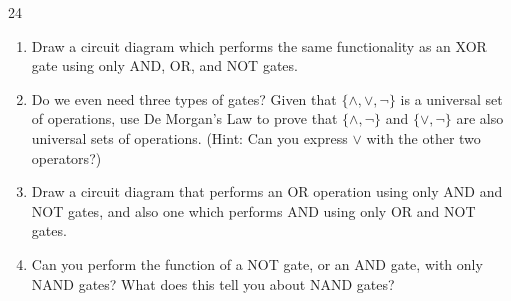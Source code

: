 \begin{exercise}{24}
\begin{enumerate}[label=(\alph*)]
        \item Draw a circuit diagram which performs the same
            functionality as an XOR gate using only AND, OR, and NOT
            gates.

        \item Do we even need three types of gates? Given that
            $\{\wedge, \vee, \neg\}$ is a universal set of operations,
            use De Morgan's Law to prove that $\{\wedge, \neg\}$ and
            $\{\vee, \neg\}$ are also universal sets of operations.
            (Hint: Can you express $\vee$ with the other two
            operators?)

        \item Draw a circuit diagram that performs an OR operation
            using only AND and NOT gates, and also one which performs
            AND using only OR and NOT gates.

        \item Can you perform the function of a NOT gate, or an AND
            gate, with only NAND gates? What does this tell you about
            NAND gates?
    \end{enumerate}
\end{exercise}
